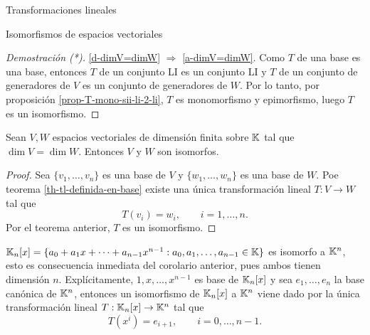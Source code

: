 \begin{chapter}{Transformaciones lineales}
\begin{section}{Isomorfismos de espacios vectoriales}
\begin{proof}[Demostración (*)]
            \ref{d-dimV=dimW} $\Rightarrow$ \ref{a-dimV=dimW}. Como $T$ de una base es una base,  entonces $T$  de un conjunto LI es un conjunto LI y $T$ de un conjunto de generadores de $V$  es un conjunto de generadores de $W$. Por lo tanto, por proposición \ref{prop-T-mono-sii-li-2-li}, $T$ es monomorfismo y epimorfismo, luego $T$ es un isomorfismo. 	
        \end{proof}
    
        \begin{corolario}
            Sean $V,W$ espacios vectoriales de dimensión  finita sobre $\mathbb K$ tal que $\dim V = \dim W$. Entonces $V$ y $W$ son  isomorfos. 
        \end{corolario}
        \begin{proof}
            Sea $\{v_1,\ldots,v_n \}$ es una base de $V$ y $\{w_1,\ldots,w_n \}$ es una base de $W$. Poe teorema \ref{th-tl-definida-en-base} existe una única transformación lineal $T:V \to W$ tal que
            \begin{equation*}
            T(v_i) = w_i, \qquad i=1,\ldots, n.
            \end{equation*}
            Por  el teorema anterior, $T$  es un isomorfismo.
        \end{proof}
    
    
    \begin{ejemplo*} $\mathbb K_n[x] = \{a_0+a_1x+\cdots+a_{n-1}x^{n-1}: a_0,a_1, \ldots,a_{n-1} \in \mathbb K \}$  es isomorfo a $\mathbb K^n$, esto es  consecuencia inmediata del corolario anterior, pues ambos tienen dimensión $n$. Explícitamente, $1,x,\ldots,x^{n-1}$  es base de $\mathbb K_n[x]$ y sea $e_1,\ldots,e_n$ la base canónica  de $\mathbb K^n$,  entonces un isomorfismo de $\mathbb K_n[x]$ a $\mathbb K^n$ viene dado por la única transformación lineal $T:\mathbb K_n[x] \to\mathbb K^n$ tal que
        $$
        T(x^i) = e_{i+1},\qquad i=0,\ldots, n-1.
        $$   
        
    \end{ejemplo*}


\end{section}
\end{chapter}
